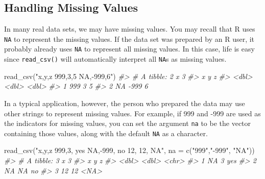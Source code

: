 \documentclass[
]{book}
\newenvironment{Shaded}{\begin{snugshade}}{\end{snugshade}}
\newcommand{\AttributeTok}[1]{\textcolor[rgb]{0.77,0.63,0.00}{#1}}
\newcommand{\CommentTok}[1]{\textcolor[rgb]{0.56,0.35,0.01}{\textit{#1}}}
\newcommand{\FunctionTok}[1]{\textcolor[rgb]{0.00,0.00,0.00}{#1}}
\newcommand{\NormalTok}[1]{#1}
\newcommand{\StringTok}[1]{\textcolor[rgb]{0.31,0.60,0.02}{#1}}
\begin{document}
\hypertarget{handling-missing-values}{%
\subsection{Handling Missing Values}\label{handling-missing-values}}

In many real data sets, we may have missing values. You may recall that R uses \texttt{NA} to represent the missing values. If the data set was prepared by an R user, it probably already uses \texttt{NA} to represent all missing values. In this case, life is easy since \texttt{read\_csv()} will automatically interpret all \texttt{NA}s as missing values.

\begin{Shaded}
\begin{Highlighting}[]
\FunctionTok{read\_csv}\NormalTok{(}\StringTok{"x,y,z}
\StringTok{          999,3,5}
\StringTok{         NA,{-}999,6"}\NormalTok{)}
\CommentTok{\#\textgreater{} \# A tibble: 2 x 3}
\CommentTok{\#\textgreater{}       x     y     z}
\CommentTok{\#\textgreater{}   \textless{}dbl\textgreater{} \textless{}dbl\textgreater{} \textless{}dbl\textgreater{}}
\CommentTok{\#\textgreater{} 1   999     3     5}
\CommentTok{\#\textgreater{} 2    NA  {-}999     6}
\end{Highlighting}
\end{Shaded}

In a typical application, however, the person who prepared the data may use other strings to represent missing values. For example, if 999 and -999 are used as the indicators for missing values, you can set the argument \texttt{na} to be the vector containing those values, along with the default \texttt{NA} as a character.

\begin{Shaded}
\begin{Highlighting}[]
\FunctionTok{read\_csv}\NormalTok{(}\StringTok{"x,y,z}
\StringTok{          999,3, yes}
\StringTok{         NA,{-}999, no}
\StringTok{         12, 12, NA"}\NormalTok{, }\AttributeTok{na =} \FunctionTok{c}\NormalTok{(}\StringTok{"999"}\NormalTok{,}\StringTok{"{-}999"}\NormalTok{, }\StringTok{"NA"}\NormalTok{))}
\CommentTok{\#\textgreater{} \# A tibble: 3 x 3}
\CommentTok{\#\textgreater{}       x     y z    }
\CommentTok{\#\textgreater{}   \textless{}dbl\textgreater{} \textless{}dbl\textgreater{} \textless{}chr\textgreater{}}
\CommentTok{\#\textgreater{} 1    NA     3 yes  }
\CommentTok{\#\textgreater{} 2    NA    NA no   }
\CommentTok{\#\textgreater{} 3    12    12 \textless{}NA\textgreater{}}
\end{Highlighting}
\end{Shaded}
\end{document}
